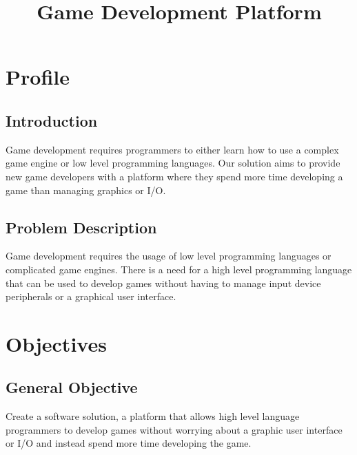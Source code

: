 \documentclass{article}
\title{Game Development Platform}
\author{}
\date{}
\begin{document}
\maketitle

\section{Profile}

\subsection{Introduction}
Game development requires programmers to either learn how to use a complex game engine or low level programming languages. Our solution aims to provide new game developers with a platform where they spend more time developing a game than managing graphics or I/O.

\subsection{Problem Description}
Game development requires the usage of low level programming languages or complicated game engines. There is a need for a high level programming language that can be used to develop games without having to manage input device peripherals or a graphical user interface.

\section{Objectives}

\subsection{General Objective}
Create a software solution, a platform that allows high level language programmers to develop games without worrying about a graphic user interface or I/O and instead spend more time developing the game.
\end{document}
